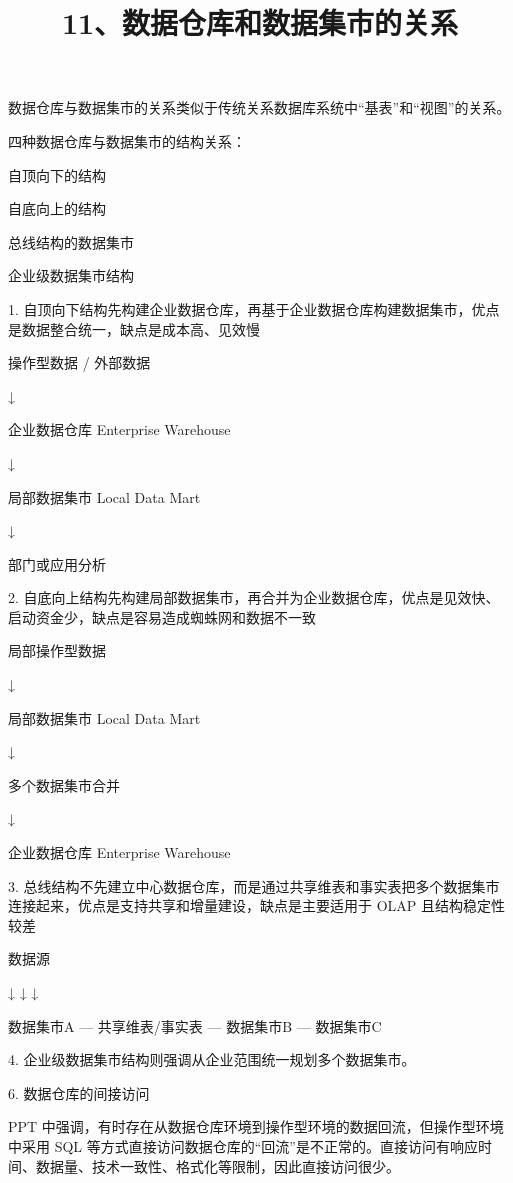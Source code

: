 \documentclass[UTF8,zihao=-4]{ctexart}
\begin{document}
\title{11、数据仓库和数据集市的关系}
\author{}
\date{}
\maketitle

数据仓库与数据集市的关系类似于传统关系数据库系统中“基表”和“视图”的关系。\par

四种数据仓库与数据集市的结构关系：\par

自顶向下的结构\par
自底向上的结构\par
总线结构的数据集市\par
企业级数据集市结构\par

1. 自顶向下结构先构建企业数据仓库，再基于企业数据仓库构建数据集市，优点是数据整合统一，缺点是成本高、见效慢\par

操作型数据 / 外部数据\par
\hspace*{1em}↓\par
企业数据仓库 Enterprise Warehouse\par
\hspace*{1em}↓\par
局部数据集市 Local Data Mart\par
\hspace*{1em}↓\par
部门或应用分析\par

2. 自底向上结构先构建局部数据集市，再合并为企业数据仓库，优点是见效快、启动资金少，缺点是容易造成蜘蛛网和数据不一致\par

局部操作型数据\par
\hspace*{1em}↓\par
局部数据集市 Local Data Mart\par
\hspace*{1em}↓\par
多个数据集市合并\par
\hspace*{1em}↓\par
企业数据仓库 Enterprise Warehouse\par

3. 总线结构不先建立中心数据仓库，而是通过共享维表和事实表把多个数据集市连接起来，优点是支持共享和增量建设，缺点是主要适用于 OLAP 且结构稳定性较差\par

数据源\par
\hspace*{1em}↓        ↓        ↓\par
数据集市A — 共享维表/事实表 — 数据集市B — 数据集市C\par

4. 企业级数据集市结构则强调从企业范围统一规划多个数据集市。\par

6. 数据仓库的间接访问\par

PPT 中强调，有时存在从数据仓库环境到操作型环境的数据回流，但操作型环境中采用 SQL 等方式直接访问数据仓库的“回流”是不正常的。直接访问有响应时间、数据量、技术一致性、格式化等限制，因此直接访问很少。\par
\end{document}

